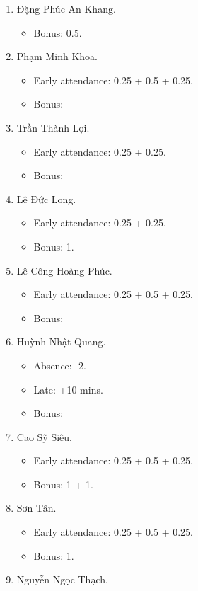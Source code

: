 \documentclass{article}
\begin{document}
\begin{enumerate}
\begin{itemize}
	\end{itemize}
	\item {\sc Đặng Phúc An Khang.}
	\begin{itemize}
		\item Bonus: 0.5.
	\end{itemize}
	\item {\sc Phạm Minh Khoa.}
	\begin{itemize}
		\item Early attendance: 0.25 + 0.5 + 0.25.
		\item Bonus:
	\end{itemize}
	\item {\sc Trần Thành Lợi.}
	\begin{itemize}
		\item Early attendance: 0.25 + 0.25.
		\item Bonus: 
	\end{itemize}
	\item {\sc Lê Đức Long.}
	\begin{itemize}
		\item Early attendance: 0.25 + 0.25.
		\item Bonus: 1.
	\end{itemize}
	\item {\sc Lê Công Hoàng Phúc.}
	\begin{itemize}
		\item Early attendance: 0.25 + 0.5 + 0.25.
		\item Bonus: 
	\end{itemize}
	\item {\sc Huỳnh Nhật Quang.}
	\begin{itemize}
		\item Absence: -2.
		\item Late: +10 mins.
		\item Bonus: 
	\end{itemize}
	\item {\sc Cao Sỹ Siêu.}
	\begin{itemize}
		\item Early attendance: 0.25 + 0.5 + 0.25.
		\item Bonus: 1 + 1.
	\end{itemize}
	\item {\sc Sơn Tân.}
	\begin{itemize}
		\item Early attendance: 0.25 + 0.5 + 0.25.
		\item Bonus: 1.
	\end{itemize}
	\item {\sc Nguyễn Ngọc Thạch.}

\end{enumerate}
\end{document}

